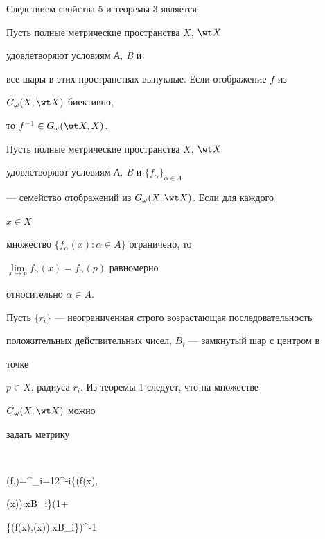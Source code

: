  


Следствием свойства 5 и теоремы 3 является 


 


\begin{thm} Пусть полные метрические пространства $X$, $\wt X$ 


удовлетворяют условиям {\em А, B} и 


все шары в этих пространствах выпуклые. Если отображение $f$ из 


$G_{\omega}(X,\wt X)$ биективно, 


то $f^{-1}\in G_{\omega}(\wt X,X)$. 


\end{thm} 


 


\begin{thm} Пусть полные метрические пространства $X$, $\wt X$ 


удовлетворяют условиям {\em А, B} и $\{f_\alpha\}_{\alpha\in A}$ 


--- семейство отображений из $G_\omega(X,\wt X)$. Если для каждого 


$x\in X$ 


множество $\{f_\alpha(x):\alpha\in A\}$ ограничено, то 


$\lim\limits_{x\to p}f_\alpha(x)=f_\alpha(p)$ равномерно 


относительно $\alpha\in A$. 


\end{thm} 


 


Пусть $\{r_i\}$ --- неограниченная строго возрастающая последовательность 


положительных действительных чисел, $B_i$ --- замкнутый шар с центром в 


точке 


$p\in X$, радиуса $r_i$. Из теоремы 1 следует, что на множестве 


$G_\omega(X,\wt X)$ можно 


задать метрику 


\cite{Sos} 


$$ 


\delta(f,\varphi)=\sum^\infty_{i=1}2^{-i}\cdot\sup\{\wt\rho(f(x), 


\varphi(x)):x\in B_i\}\cdot(1+ 


\sup\{\wt\rho(f(x),\varphi(x)):x\in B_i\})^{-1} 



